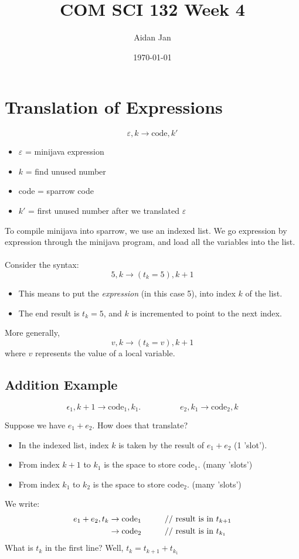 \documentclass[10pt]{article}
\title{COM SCI 132 Week 4}
\author{Aidan Jan}
\date{\today}
\begin{document}
\maketitle
\section*{Translation of Expressions}
\[\varepsilon, k \rightarrow \text{code}, k'\]
\begin{itemize}
    \item $\varepsilon$ = minijava expression
    \item $k$ = find unused number
    \item code = sparrow code
    \item $k'$ = first unused number after we translated $\varepsilon$
\end{itemize}
To compile minijava into sparrow, we use an indexed list.  We go expression by expression through the minijava program, and load all the variables into the list.\\\\
Consider the syntax:
\[5, k \rightarrow (t_k = 5), k + 1\]
\begin{itemize}
    \item This means to put the \textit{expression} (in this case 5), into index $k$ of the list.
    \item The end result is $t_k = 5$, and $k$ is incremented to point to the next index.
\end{itemize}
More generally,
\[v, k \rightarrow (t_k = v), k + 1\]
where $v$ represents the value of a local variable.

\subsection*{Addition Example}
\[\epsilon_1, k + 1 \rightarrow \text{code}_1, k_1.\hspace{2cm} e_2, k_1 \rightarrow \text{code}_2, k\]

Suppose we have $e_1 + e_2$.  How does that translate?
\begin{itemize}
    \item In the indexed list, index $k$ is taken by the result of $e_1 + e_2$ (1 'slot').
    \item From index $k + 1$ to $k_1$ is the space to store code$_1$. (many 'slots')
    \item From index $k_1$ to $k_2$ is the space to store code$_2$.  (many 'slots')
\end{itemize}
We write:
\begin{align*}
e_1 + e_2, t_k &\rightarrow \text{code}_1 \text{\hspace{1cm}// result is in $t_{k + 1}$}\\
&\rightarrow \text{code}_2 \text{\hspace{1cm}// result is in $t_{k_1}$}
\end{align*}
What is $t_k$ in the first line?  Well, $t_k = t_{k + 1} + t_{k_1}$
\end{document}
